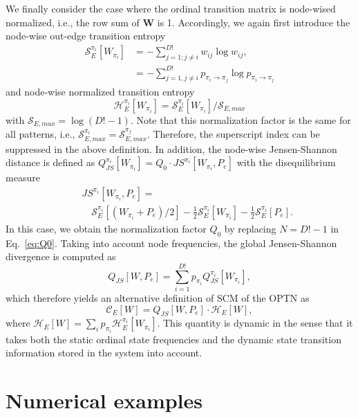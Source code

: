\documentclass[12pt,aip,cha,reprint,nofootinbib]{revtex4-1}
\begin{document}
We finally consider the case where the ordinal transition matrix is node-wised normalized, i.e., the row sum of $\mathbf{W}$ is 1. Accordingly, we again first introduce the node-wise out-edge transition entropy
\begin{equation}
\begin{split}
\mathcal{S}_{E}^{\pi_i}[W_{\pi_i}] &= - \sum_{j = 1; j \neq i}^{D!} w_{ij} \log w_{ij},  \\ 
&= - \sum_{j=1, j \neq i}^{D!} p_{\pi_i \to \pi_j} \log p_{\pi_i \to \pi_j} 
\end{split}
\end{equation}
and node-wise normalized transition entropy
\begin{equation}
\mathcal{H}_{E}^{\pi_i}[W_{\pi_i}] = \mathcal{S}_{E}^{\pi_i}[W_{\pi_i}] / \mathcal{S}_{E, max} 
\end{equation}
with $\mathcal{S}_{E, max} = \log (D! - 1)$. Note that this normalization factor is the same for all patterns, i.e., $\mathcal{S}_{E, max}^{\pi_i} = \mathcal{S}_{E, max}^{\pi_j}$. Therefore, the superscript index can be suppressed in the above definition. In addition, the node-wise Jensen-Shannon distance is defined as $Q_{JS}^{\pi_i}[W_{\pi_i}] = Q_0 \cdot JS^{\pi_i} [W_{\pi_i}, P_e]$ with the disequilibrium measure
\begin{eqnarray}
&&JS^{\pi_i} [W_{\pi_i}, P_e] = \nonumber \\
&&\quad \mathcal{S}_{E}^{\pi_i}[(W_{\pi_i} + P_e)/2] - \frac{1}{2}\mathcal{S}_{E}^{\pi_i}[W_{\pi_i}] - \frac{1}{2}\mathcal{S}_{E}^{\pi_i}[P_e]. 
\end{eqnarray}
In this case, we obtain the normalization factor $Q_0$ by replacing $N = D! - 1$ in Eq.~\eqref{eq:Q0}. Taking into account node frequencies, the global Jensen-Shannon divergence is computed as 
\begin{equation}
Q_{JS}[W, P_e] = \sum_{i=1}^{D!} p_{\pi_i} Q_{JS}^{\pi_i}[W_{\pi_i}], 
\end{equation}
which therefore yields an alternative definition of SCM of the OPTN as 
\begin{equation}
\mathcal{C}_{E}[W] = Q_{JS}[W, P_e] \cdot \mathcal{H}_{E}[W], 
\end{equation}
where $\mathcal{H}_{E}[W] = \sum_{i} p_{\pi_i} \mathcal{H}_{E}^{\pi_i}[W_{\pi_i}]$. This quantity is dynamic in the sense that it takes both the static ordinal state frequencies and the dynamic state transition information stored in the system into account. 

\section{Numerical examples}\label{sec:results1}
\end{document}
